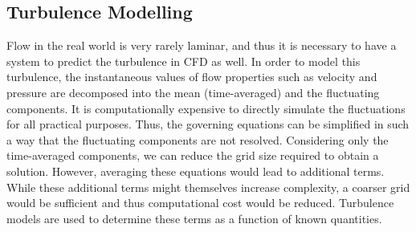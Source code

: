 \documentclass[11pt,a4paper,twoside,oneside]{article}
\begin{document}
\subsection{Turbulence Modelling}\label{sec:turbmod}
\vspace{.3cm}
Flow in the real world is very rarely laminar, and thus it is necessary to have a system to predict the turbulence in CFD as well. In order to model this turbulence, the instantaneous values of flow properties such as velocity and pressure are decomposed into the mean (time-averaged) and the fluctuating components. It is computationally expensive to directly simulate the fluctuations for all practical purposes. Thus, the governing equations can be simplified in such a way that the fluctuating components are not resolved. Considering only the time-averaged components, we can reduce the grid size required to obtain a solution. However, averaging these equations would lead to additional terms. While these additional terms might themselves increase complexity, a coarser grid would be sufficient and thus computational cost would be reduced. Turbulence models are used to determine these terms as a function of known quantities\cite{turbmodelintro}.\\%
\end{document}
